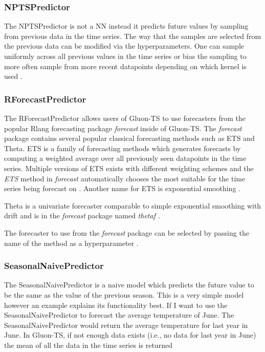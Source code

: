 \subsubsection{NPTSPredictor}
The NPTSPredictor is not a NN instead it predicts future values by sampling from previous data in the time series. The way that the samples are selected from the previous data can be modified via the hyperparameters. One can sample uniformly across all previous values in the time series or bias the sampling to more often sample from more recent datapoints depending on which kernel is used \cite{gluonts-website}.


\subsubsection{RForecastPredictor}
The RForecastPredictor allows users of Gluon-TS to use forecasters from the popular Rlang forecasting package \textit{forecast} inside of Gluon-TS. The \textit{forecast} package contains several popular classical forecasting methods such as ETS and Theta. ETS is a family of forecasting methods which generates forecasts by computing a weighted average over all previously seen datapoints in the time series. Multiple versions of ETS exists with different weighting schemes and the \textit{ETS} method in \textit{forecast} automatically chooses the most suitable for the time series being forecast on \cite{r-forecast-package}. Another name for ETS is exponential smoothing \cite{hyndman_forecasting_3rd}.

Theta is a univariate forecaster comparable to simple exponential smoothing with drift and is in the \textit{forecast} package named \textit{thetaf} \cite{hyndman2003unmasking}.

The forecaster to use from the \textit{forecast} package can be selected by passing the name of the method as a hyperparameter \cite{gluonts-website,r-forecast-package}.

\subsubsection{SeasonalNaivePredictor}
\label{model:seasonal_naive}
The SeasonalNaivePredictor is a naive model which predicts the future value to be the same as the value of the previous season. This is a very simple model however an example explains its functionality best. If I want to use the SeasonalNaivePredictor to forecast the average temperature of June. The SeasonalNaivePredictor would return the average temperature for last year in June. In Gluon-TS, if not enough data exists (i.e., no data for last year in June) the mean of all the data in the time series is returned \cite{gluonts-website,hyndman_forecasting_3rd}


